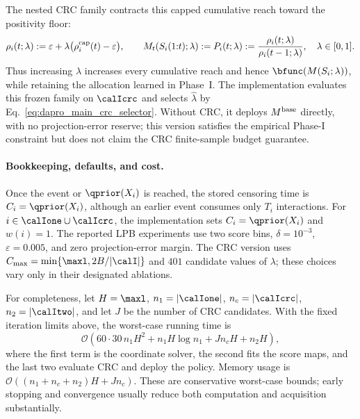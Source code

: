 The nested CRC family contracts this capped cumulative reach toward the
positivity floor:
\begin{equation}
    \rho_i(t;\lambda)
    :=\varepsilon+\lambda
      \bigl(\rho_i^{\rm cap}(t)-\varepsilon\bigr),
    \qquad
    M_t(S_i(1{:}t);\lambda)
    :=P_i(t;\lambda)
    :=\frac{\rho_i(t;\lambda)}{\rho_i(t-1;\lambda)},
    \quad \lambda\in[0,1].
    \label{eq:lpb_impl_crc_family}
\end{equation}
Thus increasing \(\lambda\) increases every cumulative reach and hence
\(\bfunc(M(S_i;\lambda))\), while retaining the allocation learned in
Phase~I. The implementation evaluates this frozen family on \(\calIcrc\)
and selects \(\widehat\lambda\) by
Eq.~\eqref{eq:dapro_main_crc_selector}. Without CRC, it deploys
\(M^{\rm base}\) directly, with no projection-error reserve; this version
satisfies the empirical Phase-I constraint but does not claim the CRC
finite-sample budget guarantee.

\paragraph{Bookkeeping, defaults, and cost.}
Once the event or \(\qprior(X_i)\) is reached, the stored censoring time is
\(C_i=\qprior(X_i)\), although an earlier event consumes only \(T_i\)
interactions. For \(i\in\calIone\cup\calIcrc\), the implementation sets
\(C_i=\qprior(X_i)\) and \(w(i)=1\). The reported LPB experiments use two
score bins, \(\delta=10^{-3}\), \(\varepsilon=0.005\), and zero
projection-error margin. The CRC version uses
\(C_{\max}=\min\{\maxl,2B/|\calI|\}\) and \(401\) candidate values of
\(\lambda\); these choices vary only in their designated ablations.

For completeness, let \(H=\maxl\), \(n_1=|\calIone|\),
\(n_c=|\calIcrc|\), \(n_2=|\calItwo|\), and let \(J\) be the number of CRC
candidates. With the fixed iteration limits above, the worst-case running
time is
\begin{equation}
    \mathcal O\!\left(
      60\cdot30\,n_1H^2+n_1H\log n_1+Jn_cH+n_2H
    \right),
\end{equation}
where the first term is the coordinate solver, the second fits the score maps,
and the last two evaluate CRC and deploy the policy. Memory usage is
\(\mathcal O((n_1+n_c+n_2)H+Jn_c)\). These are conservative worst-case
bounds; early stopping and convergence usually reduce both computation and
acquisition substantially.
